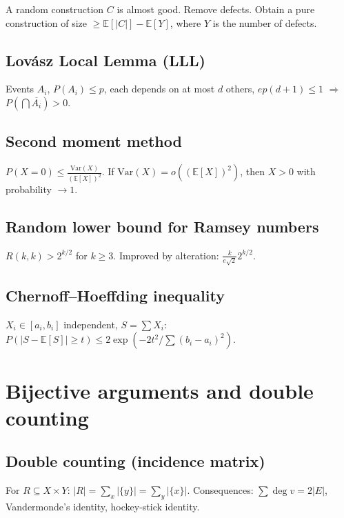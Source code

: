 A random construction $C$ is almost good. Remove defects. Obtain a pure construction of size $\ge\mathbb{E}[|C|]-\mathbb{E}[Y]$, where $Y$ is the number of defects.

\subsection{Lov\'asz Local Lemma (LLL)}
\label{subsec:lll}

Events $A_i$, $P(A_i)\le p$, each depends on at most $d$ others, $ep(d+1)\le 1$ $\Rightarrow$ $P(\bigcap\overline{A_i})>0$.

\subsection{Second moment method}
\label{subsec:second-moment}

$P(X=0)\le\frac{\mathrm{Var}(X)}{(\mathbb{E}[X])^2}$. If $\mathrm{Var}(X)=o((\mathbb{E}[X])^2)$, then $X>0$ with probability $\to 1$.

\subsection{Random lower bound for Ramsey numbers}
\label{subsec:ramsey-random}

$R(k,k) > 2^{k/2}$ for $k\ge 3$. Improved by alteration: $\frac{k}{e\sqrt{2}}2^{k/2}$.

\subsection{Chernoff--Hoeffding inequality}
\label{subsec:chernoff}

$X_i\in[a_i,b_i]$ independent, $S=\sum X_i$: $P(|S-\mathbb{E}[S]|\ge t)\le 2\exp(-2t^2/\sum(b_i-a_i)^2)$.

\medskip

\section{Bijective arguments and double counting}
\label{sec:double-counting}

\subsection{Double counting (incidence matrix)}
\label{subsec:double-counting}

For $R\subseteq X\times Y$: $|R|=\sum_x|\{y\}|=\sum_y|\{x\}|$. Consequences: $\sum\deg v=2|E|$, Vandermonde's identity, hockey-stick identity.

